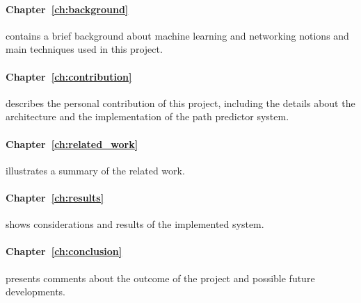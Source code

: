 \paragraph{Chapter~\ref{ch:background}} contains a brief background about machine learning and networking notions and main techniques used in this project.
\paragraph{Chapter~\ref{ch:contribution}} describes the personal contribution of this project, including the details about the architecture and the implementation of the path predictor system.
\paragraph{Chapter~\ref{ch:related_work}} illustrates a summary of the related work.
\paragraph{Chapter~\ref{ch:results}} shows considerations and results of the implemented system.
\paragraph{Chapter~\ref{ch:conclusion}} presents comments about the outcome of the project and possible future developments.

